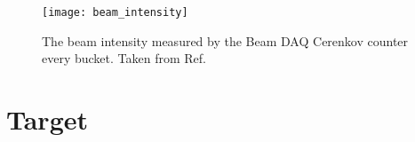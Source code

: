 \begin{figure}[htpb!]
	\centering
	\texttt{[image: beam\_intensity]}
	\caption{The beam intensity measured by the Beam DAQ Cerenkov counter every 
		bucket. Taken from Ref.\ \cite{aidala2019}}
\end{figure}

\section{Target}

